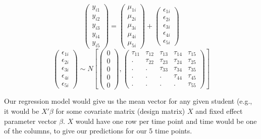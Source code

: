 \documentclass[
  letterpaper,
  DIV=11,
  numbers=noendperiod]{scrreprt}
\begin{document}
\[\begin{pmatrix}y_{i1}\\
y_{i2}\\
y_{i3}\\
y_{i4}\\
y_{i5}
\end{pmatrix} = \left(\begin{array}{c}
\mu_{1i}\\
\mu_{2i}\\
\mu_{3i}\\
\mu_{4i}\\
\mu_{5i}
\end{array}\right) + \left(\begin{array}{c}
\epsilon_{1i}\\
\epsilon_{2i}\\
\epsilon_{3i}\\
\epsilon_{4i}\\
\epsilon_{5i}
\end{array}\right)\] \[\left(\begin{array}{c}
\epsilon_{1i}\\
\epsilon_{2i}\\
\epsilon_{3i}\\
\epsilon_{4i}\\
\epsilon_{5i}
\end{array}\right)\sim N\left[\left(\begin{array}{c}
0\\
0\\
0\\
0\\
0
\end{array}\right),\left(\begin{array}{ccccc}
\tau_{11} & \tau_{12} & \tau_{13} & \tau_{14} & \tau_{15}\\
. & \tau_{22} & \tau_{23}& \tau_{24} & \tau_{25}\\
. & . & \tau_{33}& \tau_{34} & \tau_{35}\\
. & . & . & \tau_{44} & \tau_{45}\\
. & . & . & . & \tau_{55}
\end{array}\right)\right]\]

Our regression model would give us the mean vector for any given student
(e.g., it would be \(X'\beta\) for some covariate matrix (design matrix)
\(X\) and fixed effect parameter vector \(\beta\). \(X\) would have one
row per time point and time would be one of the columns, to give our
predictions for our 5 time points.
\end{document}
